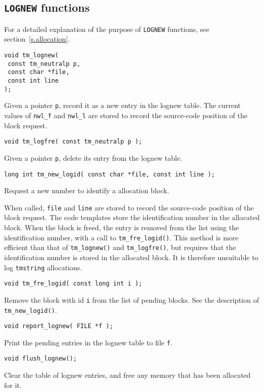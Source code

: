 \subsection{{\tt LOGNEW} functions}
For a detailed explanation of the purpose of {\tt LOGNEW} functions,
see section~\ref{s.allocation}.
\begin{verbatim}
void tm_lognew(
 const tm_neutralp p,
 const char *file,
 const int line
);
\end{verbatim}
\begin{desc}
Given a pointer {\tt p}, record it as a new entry in the lognew table.
The current values of \verb+nwl_f+ and \verb+nwl_l+
are stored to record the source-code position of the block request.
\end{desc}
\begin{verbatim}
void tm_logfre( const tm_neutralp p );
\end{verbatim}
\begin{desc}
Given a pointer {\tt p}, delete its entry from the lognew table.
\end{desc}
\begin{verbatim}
long int tm_new_logid( const char *file, const int line );
\end{verbatim}
\begin{desc}
Request a new number to identify a {\Tm} allocation block.
\par
When called, \verb+file+ and \verb+line+
are stored to record the source-code position of the block request.
The {\Tm} code templates store the identification number in the
allocated block.
When the block is freed, the entry is removed from the list
using the identification number, with a call to \verb+tm_fre_logid()+.
This method is more efficient than that of \verb+tm_lognew()+
and \verb+tm_logfre()+,
but requires that the identification number is stored in the
allocated block.
It is therefore unsuitable to log \verb+tmstring+ allocations.
\end{desc}
\begin{verbatim}
void tm_fre_logid( const long int i );
\end{verbatim}
\begin{desc}
Remove the block with id {\tt i} from the list of pending blocks.
See the description of \verb+tm_new_logid()+.
\end{desc}
\begin{verbatim}
void report_lognew( FILE *f );
\end{verbatim}
\begin{desc}
Print the pending entries in the lognew table to file {\tt f}.
\end{desc}
\begin{verbatim}
void flush_lognew();
\end{verbatim}
\begin{desc}
Clear the table of lognew entries, and free any memory that
has been allocated for it.
\end{desc}

